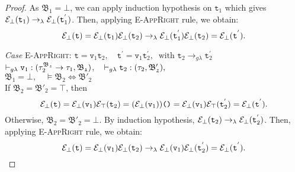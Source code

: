 \begin{proof}
As $\mathfrak{B_{1}} = \bot$, we can apply induction hypothesis on
$\texttt{t}_{1}$ which gives  
$\mathcal{E}_{\bot}(\texttt{t}_{1}) \rightarrow_{\lambda} 
\mathcal{E}_{\bot}(\texttt{t}_{1}^{'})$.
Then, applying \textsc{E-AppRight} rule, we obtain:
$$
\mathcal{E}_{\bot}(\texttt{t}) 
= \mathcal{E}_{\bot}(\texttt{t}_{1})\mathcal{E}_{\bot}(\texttt{t}_{2})
\rightarrow_{\lambda} 
\mathcal{E}_{\bot}(\texttt{t}^{'}_{1})\mathcal{E}_{\bot}(\texttt{t}_{2})
= \mathcal{E}_{\bot}(\texttt{t}^{'}).$$




\noindent\textit{Case} \textsc{E-AppRight}: \qquad 
 $\texttt{t} = \texttt{v}_{1} \texttt{t}_{2},\quad
 \texttt{t}^{'} = \texttt{v}_{1} \texttt{t}^{'}_{2}, ~ \text{ with }
 \texttt{t}_{2} \rightarrow_{g\lambda} \texttt{t}^{'}_{2}$ \\
$\vdash_{g\lambda} \texttt{v}_{1} : (\tau_{2}^{\mathfrak{B_{2}}} \rightarrow \tau_{1}, \mathfrak{B_{1}})$,  ~
$\vdash_{g\lambda} \texttt{t}_{2} : (\tau_{2}, \mathfrak{B'_{2}}), $ \\ 
$ \mathfrak{B_{1}} = \bot,  \quad 
\vDash\mathfrak{B_{2}} \Leftrightarrow \mathfrak{B'_{2}} $ \\
If $\mathfrak{B_{2}} = \mathfrak{B'_{2}} = \top $, then
$$\mathcal{E}_{\bot}(\texttt{t}) 
= \mathcal{E}_{\bot}(\texttt{v}_{1})\mathcal{E}_{\top}(\texttt{t}_{2})
= (\mathcal{E}_{\bot}(\texttt{v}_{1}))\texttt{()}
= \mathcal{E}_{\bot}(\texttt{v}_{1})\mathcal{E}_{\top}(\texttt{t}^{'}_{2})
= \mathcal{E}_{\bot}(\texttt{t}^{'}). $$
Otherwise, $\mathfrak{B_{2}} = \mathfrak{B'_{2}} = \bot $.
By induction hypothesis, 
$\mathcal{E}_{\bot}(\texttt{t}_{2}) \rightarrow_{\lambda} 
\mathcal{E}_{\bot}(\texttt{t}_{2}^{'})$.
Then, applying \textsc{E-AppRight} rule, we obtain:
$$
\mathcal{E}_{\bot}(\texttt{t}) 
= \mathcal{E}_{\bot}(\texttt{v}_{1})\mathcal{E}_{\bot}(\texttt{t}_{2})
\rightarrow_{\lambda} 
\mathcal{E}_{\bot}(\texttt{v}_{1})\mathcal{E}_{\bot}(\texttt{t}^{'}_{2})
= \mathcal{E}_{\bot}(\texttt{t}^{'}).$$




%
%
 

\end{proof}

